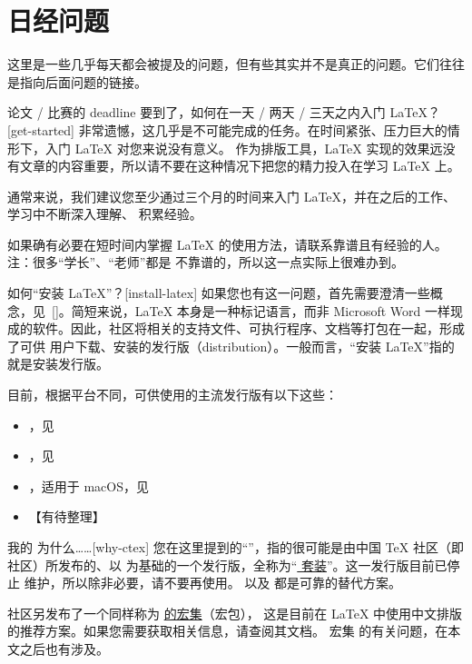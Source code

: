 \section{日经问题}
\label{sec:starter}

这里是一些几乎每天都会被提及的问题，但有些其实并不是真正的问题。它们往往是指向后面问题的链接。

\begin{faq}{论文 / 比赛的 deadline 要到了，如何在一天 / 两天 / 三天之内入门 \LaTeX{}？}[get-started]
  非常遗憾，这几乎是不可能完成的任务。在时间紧张、压力巨大的情形下，入门 \LaTeX{} 对您来说没有意义。
  作为排版工具，\LaTeX{} 实现的效果远没有文章的内容重要，所以请不要在这种情况下把您的精力投入在学习
  \LaTeX{} 上。
  
  通常来说，我们建议您至少通过三个月的时间来入门 \LaTeX{}，并在之后的工作、学习中不断深入理解、
  积累经验。
  
  如果确有必要在短时间内掌握 \LaTeX{} 的使用方法，请联系靠谱且有经验的人。注：很多“学长”、“老师”都是
  不靠谱的，所以这一点实际上很难办到。
\end{faq}

\begin{faq}{如何“安装 \LaTeX{}”？}[install-latex]
  如果您也有这一问题，首先需要澄清一些概念，见~\ref{}。简短来说，\LaTeX{} 本身是一种标记语言，而非
  Microsoft Word 一样现成的软件。因此，社区将相关的支持文件、可执行程序、文档等打包在一起，形成了可供
  用户下载、安装的发行版（distribution）。一般而言，“安装 \LaTeX{}”指的就是安装发行版。
  
  目前，根据平台不同，可供使用的主流发行版有以下这些：
  
  \begin{itemize}
  
    \item \TeXLive{}，见~
    \item \MiKTeX{}，见~
    \item \MacTeX{}，适用于 macOS，见~
    \item 【有待整理】
  \end{itemize}
\end{faq}

\begin{faq}{我的 \CTeX{} 为什么……}[why-ctex]
  您在这里提到的“\CTeX{}”，指的很可能是由中国 \TeX{} 社区（即 \CTeX{} 社区）所发布的、以 \MiKTeX{}
  为基础的一个发行版，全称为“\href{http://www.ctex.org/CTeX}{\CTeX{} 套装}”。这一发行版目前已停止
  维护，所以除非必要，请不要再使用。\TeXLive{} 以及 \MiKTeX{} 都是可靠的替代方案。
  
  \CTeX{} 社区另发布了一个同样称为 \href{https://www.ctan.org/pkg/ctex}{\CTeX{} 的宏集}（宏包），
  这是目前在 \LaTeX{} 中使用中文排版的推荐方案。如果您需要获取相关信息，请查阅其文档。\CTeX{} 宏集
  的有关问题，在本文之后也有涉及。
\end{faq}
